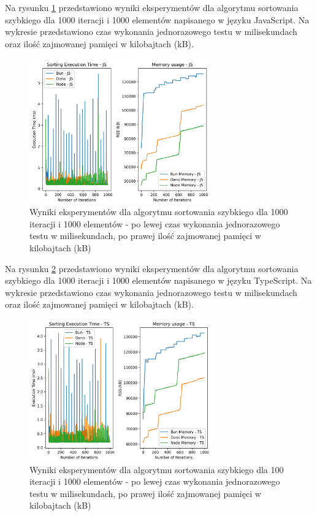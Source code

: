 Na rysunku \ref{fig:quick_sorting_e3} przedstawiono wyniki eksperymentów dla algorytmu sortowania szybkiego dla 1000 iteracji i 1000 elementów napisanego w języku JavaScript. Na wykresie przedstawiono czas wykonania jednorazowego testu w milisekundach oraz ilość zajmowanej pamięci w kilobajtach (kB).

\begin{figure}[H]
  \centering
  \includegraphics[width=0.7\textwidth]{Figures/sorting/sorting_quick_1000_1000_js.png}
  \caption{Wyniki eksperymentów dla algorytmu sortowania szybkiego dla 1000 iteracji i 1000 elementów - po lewej czas wykonania jednorazowego testu w milisekundach, po prawej ilość zajmowanej pamięci w kilobajtach (kB)}
  \label{fig:quick_sorting_e3}
\end{figure}

Na rysunku \ref{fig:quick_sorting_e3_ts} przedstawiono wyniki eksperymentów dla algorytmu sortowania szybkiego dla 1000 iteracji i 1000 elementów napisanego w języku TypeScript. Na wykresie przedstawiono czas wykonania jednorazowego testu w milisekundach oraz ilość zajmowanej pamięci w kilobajtach (kB).

\begin{figure}[H]
  \centering
  \includegraphics[width=0.7\textwidth]{Figures/sorting/sorting_quick_1000_1000_ts.png}
  \caption{Wyniki eksperymentów dla algorytmu sortowania szybkiego dla 100 iteracji i 1000 elementów - po lewej czas wykonania jednorazowego testu w milisekundach, po prawej ilość zajmowanej pamięci w kilobajtach (kB)}
  \label{fig:quick_sorting_e3_ts}
\end{figure}

